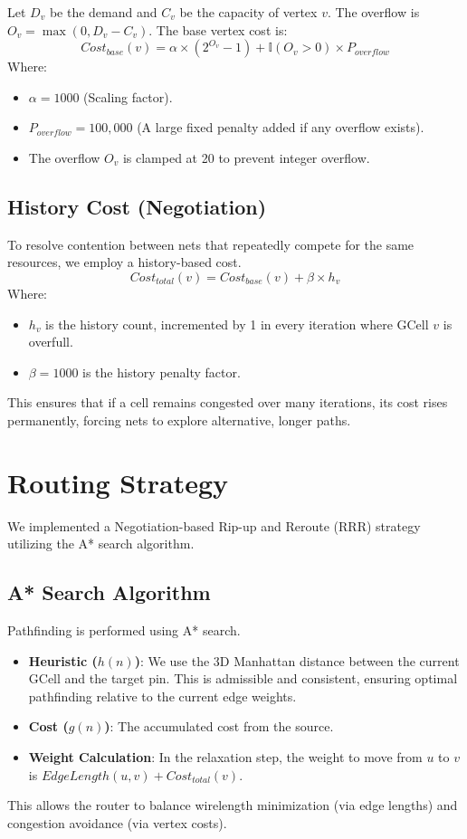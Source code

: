 \documentclass[a4paper,12pt]{article}
\begin{document}
Let $D_v$ be the demand and $C_v$ be the capacity of vertex $v$. The overflow is $O_v = \max(0, D_v - C_v)$. The base vertex cost is:
\begin{equation}
    Cost_{base}(v) = \alpha \times (2^{O_v} - 1) + \mathbb{I}(O_v > 0) \times P_{overflow}
\end{equation}
Where:
\begin{itemize}
    \item $\alpha = 1000$ (Scaling factor).
    \item $P_{overflow} = 100,000$ (A large fixed penalty added if any overflow exists).
    \item The overflow $O_v$ is clamped at 20 to prevent integer overflow.
\end{itemize}

\subsection{History Cost (Negotiation)}
To resolve contention between nets that repeatedly compete for the same resources, we employ a history-based cost.
\begin{equation}
    Cost_{total}(v) = Cost_{base}(v) + \beta \times h_v
\end{equation}
Where:
\begin{itemize}
    \item $h_v$ is the history count, incremented by 1 in every iteration where GCell $v$ is overfull.
    \item $\beta = 1000$ is the history penalty factor.
\end{itemize}

This ensures that if a cell remains congested over many iterations, its cost rises permanently, forcing nets to explore alternative, longer paths.

\section{Routing Strategy}

We implemented a Negotiation-based Rip-up and Reroute (RRR) strategy utilizing the A* search algorithm.

\subsection{A* Search Algorithm}
Pathfinding is performed using A* search.
\begin{itemize}
    \item \textbf{Heuristic ($h(n)$)}: We use the 3D Manhattan distance between the current GCell and the target pin. This is admissible and consistent, ensuring optimal pathfinding relative to the current edge weights.
    \item \textbf{Cost ($g(n)$)}: The accumulated cost from the source.
    \item \textbf{Weight Calculation}: In the relaxation step, the weight to move from $u$ to $v$ is $EdgeLength(u,v) + Cost_{total}(v)$.
\end{itemize}
This allows the router to balance wirelength minimization (via edge lengths) and congestion avoidance (via vertex costs).
\end{document}
